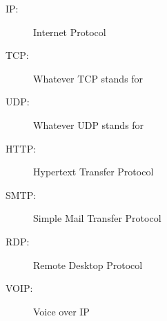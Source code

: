 
\begin{description}
	\item[IP:] Internet Protocol
	\item[TCP:] Whatever TCP stands for
	\item[UDP:] Whatever UDP stands for
	\item[HTTP:] Hypertext Transfer Protocol
	\item[SMTP:] Simple Mail Transfer Protocol
	\item[RDP:]	Remote Desktop Protocol
	\item[VOIP:] Voice over IP
\end{description}